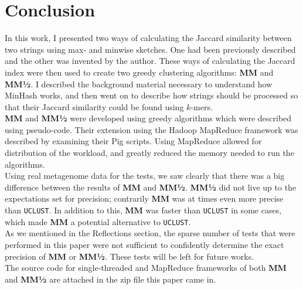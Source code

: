\documentclass[../../main.tex]{subfiles}
\begin{document}
\section{Conclusion}

In this work, I presented two ways of calculating the Jaccard similarity between two strings using max- and minwise sketches. One had been previously described and the other was invented by the author. These ways of calculating the Jaccard index were then used to create two greedy clustering algorithms: {\bf MM} and {\bf MM½}. I described the background material necessary to understand how MinHash works, and then went on to describe how strings should be processed so that their Jaccard similarity could be found using $k$-mers.\\

{\bf MM} and {\bf MM½} were developed using greedy algorithms which were described using pseudo-code. Their extension using the Hadoop MapReduce framework was described by examining their Pig scripts. Using MapReduce allowed for distribution of the workload, and greatly reduced the memory needed to run the algorithms.\\ 

Using real metagenome data for the tests, we saw clearly that there was a big difference between the results of {\bf MM} and {\bf MM½}. {\bf MM½} did not live up to the expectations set for precision; contrarily {\bf MM} was at times even more precise than {\tt UCLUST}. In addition to this, {\bf MM} was faster than {\tt UCLUST} in some cases, which made {\bf MM} a potential alternative to {\tt UCLUST}.\\

As we mentioned in the Reflections section, the sparse number of tests that were performed in this paper were not sufficient to confidently determine the exact precision of {\bf MM} or {\bf MM½}. These tests will be left for future works.\\

The source code for single-threaded and MapReduce frameworks of both {\bf MM} and {\bf MM½} are attached in the zip file this paper came in.
\end{document}
